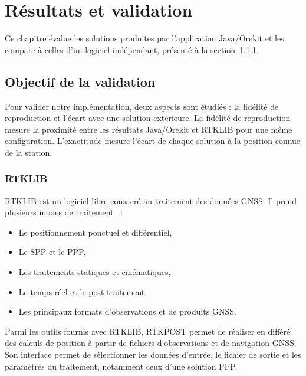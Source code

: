
\chapter{Résultats et validation}
\label{resultats_validation}


Ce chapitre évalue les solutions produites par l'application Java/Orekit et
les compare à celles d'un logiciel indépendant, présenté à la
section~\ref{sec:rtklib_reference}.
\section{Objectif de la validation}
\label{sec:validation_objective}

Pour valider notre implémentation, deux aspects sont étudiés : la fidélité de reproduction et l'écart avec une solution extérieure.
La fidélité de reproduction mesure la proximité entre les
résultats Java/Orekit et RTKLIB pour une même configuration. L'exactitude
mesure l'écart de chaque solution à la position connue de la
station.

\subsection{RTKLIB}
\label{sec:rtklib_reference}

RTKLIB est un logiciel libre consacré au traitement des données GNSS. Il prend
plusieurs modes de traitement~\cite{rtklib_manual_242} :

\begin{itemize}
    \item Le positionnement ponctuel et différentiel,
    \item Le SPP et le PPP,
    \item Les traitements statiques et cinématiques,
    \item Le temps réel et le post-traitement,
    \item Les principaux formats d'observations et de produits GNSS.
\end{itemize}

Parmi les outils fournis avec RTKLIB, RTKPOST permet de réaliser en différé
des calculs de position à partir de fichiers d'observations et de navigation
GNSS. Son interface permet de sélectionner les données d'entrée, le fichier de
sortie et les paramètres du traitement, notamment ceux d'une solution PPP.

